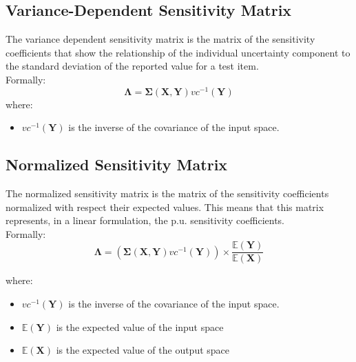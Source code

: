 \subsection{Variance-Dependent Sensitivity Matrix}
The variance dependent sensitivity matrix is the matrix of the sensitivity
coefficients that show the relationship of the individual uncertainty
component to the standard deviation of the reported value for a test
item.
\\ Formally:
\begin{equation}
\boldsymbol{\Lambda}= \boldsymbol{\Sigma}(\boldsymbol{X},\boldsymbol{Y})  vc^{-1}(\boldsymbol{Y})
\end{equation}
where:
\begin{itemize}
  \item $vc^{-1}(\boldsymbol{Y})$ is the inverse of the covariance of the
  input space.
\end{itemize}

\subsection{Normalized Sensitivity Matrix}
The normalized sensitivity matrix is the matrix of the sensitivity
coefficients normalized with respect their expected values. This means that this matrix
represents, in a linear formulation, the p.u. sensitivity coefficients.
\\ Formally:
\begin{equation}

\boldsymbol{\Lambda}= \left ( \boldsymbol{\Sigma}(\boldsymbol{X},\boldsymbol{Y})  vc^{-1}(\boldsymbol{Y}) \right ) \times \frac{\mathbb{E}(\boldsymbol{Y}) }{\mathbb{E}(\boldsymbol{X}) } 
\end{equation}

where:
\begin{itemize}
  \item $vc^{-1}(\boldsymbol{Y})$ is the inverse of the covariance of the
  input space.
  \item $\mathbb{E}(\boldsymbol{Y})$ is the expected value of the input space
  \item $\mathbb{E}(\boldsymbol{X})$ is the expected value of the output space
\end{itemize}







